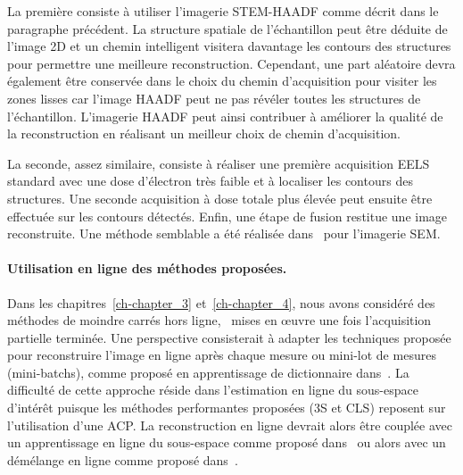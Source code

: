 La première consiste à utiliser l'imagerie STEM-HAADF comme décrit dans le paragraphe précédent. La structure spatiale de l'échantillon peut être déduite de l'image 2D et un chemin intelligent visitera davantage les contours des structures pour permettre une meilleure reconstruction. Cependant, une part aléatoire devra également être conservée dans le choix du chemin d'acquisition pour visiter les zones lisses car l'image HAADF peut ne pas révéler toutes les structures de l'échantillon. L'imagerie HAADF peut ainsi contribuer à améliorer la qualité de la reconstruction en réalisant un meilleur choix de chemin d'acquisition.

La seconde, assez similaire, consiste à réaliser une première acquisition EELS standard avec une dose d'électron très faible et à localiser les contours des structures. Une seconde acquisition à dose totale plus élevée peut ensuite être effectuée sur les contours détectés. Enfin, une étape de fusion restitue une image reconstruite. Une méthode semblable a été réalisée dans~\cite{dahmen2016feature} pour l'imagerie SEM.

\paragraph{Utilisation en ligne des méthodes proposées.} Dans les chapitres~\ref{ch-chapter_3} et~\ref{ch-chapter_4}, nous avons considéré des méthodes de moindre carrés hors ligne, \ie\ mises en \oe{}uvre une fois l'acquisition partielle terminée. Une perspective consisterait à adapter les techniques proposée pour reconstruire l'image en ligne après chaque mesure ou mini-lot de mesures (mini-batchs), comme proposé en apprentissage de dictionnaire dans~\cite{mairal2009online}. La difficulté de cette approche réside dans l'estimation en ligne du sous-espace d'intérêt puisque les méthodes performantes proposées  (3S et CLS) reposent sur l'utilisation d'une ACP.  La reconstruction en ligne devrait alors être couplée avec un apprentissage en ligne du sous-espace comme proposé dans~\cite{balzano2010online, chi2013petrels} ou alors avec un démélange en ligne comme proposé dans~\cite{thouvenin2016online}.


